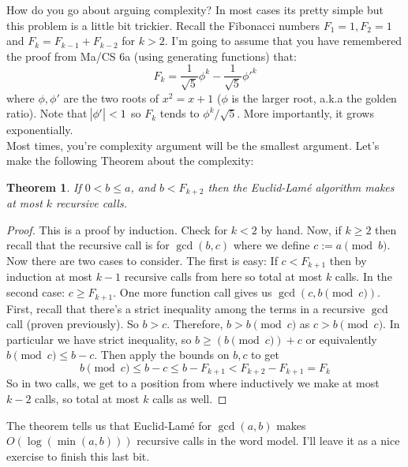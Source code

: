 \documentclass[10pt]{article}
\theoremstyle{plain}
\newtheorem{thm}{Theorem}[section] %
\theoremstyle{definition}
\numberwithin{equation}{section}
\numberwithin{figure}{section}
\begin{document}
\noindent How do you go about arguing complexity? In most cases its pretty simple but this problem is a little bit trickier. Recall the Fibonacci numbers $F_1 = 1, F_2 = 1$ and $F_k = F_{k-1} + F_{k-2}$ for $k > 2$. I'm going to assume that you have remembered the proof from Ma/CS 6a (using generating functions) that:
\begin{equation}
F_k = \frac{1}{\sqrt{5}} \phi^k - \frac{1}{\sqrt{5}} {\phi'}^k
\label{eq:4-fib}
\end{equation}
where $\phi, \phi'$ are the two roots of $x^2 = x + 1$ ($\phi$ is the larger root, a.k.a the golden ratio). Note that $\abs{\phi'} < 1$ so $F_k$ tends to $\phi^k / \sqrt{5}$. More importantly, it grows exponentially. \\

\noindent Most times, you're complexity argument will be the smallest argument. Let's make the following Theorem about the complexity:

\begin{thm}
If $0 < b \leq a$, and $b < F_{k+2}$ then the Euclid-Lam\'e algorithm makes at most $k$ recursive calls.
\end{thm}

\begin{proof}
This is a proof by induction. Check for $k < 2$ by hand. Now, if $k \geq 2$ then recall that the recursive call is for $\gcd(b, c)$ where we define $c := a \pmod  b$. Now there are two cases to consider. The first is easy: If $c < F_{k + 1}$ then by induction at most $k-1$ recursive calls from here so total at most $k$ calls. \checkmark In the second case: $c \geq F_{k+1}$. One more function call gives us $\gcd(c, b \pmod c)$. First, recall that there's a strict inequality among the terms in a recursive $\gcd$ call (proven previously). So $b > c$. Therefore, $b > b \pmod c$ as $c > b \pmod c$. In particular we have strict inequality, so $b \geq (b \pmod c) + c$ or equivalently $b \pmod c \leq b - c$. Then apply the bounds on $b,c$ to get
\begin{equation}
b \pmod c \leq b - c \leq b - F_{k + 1} < F_{k+2} - F_{k+1} = F_k
\end{equation}
So in two calls, we get to a position from where inductively we make at most $k-2$ calls, so total at most $k$ calls as well. 
\end{proof}

\noindent The theorem tells us that Euclid-Lam\'e for $\gcd(a, b)$ makes $O(\log(\min(a,b)))$ recursive calls in the word model. I'll leave it as a nice exercise to finish this last bit. \\
\end{document}
